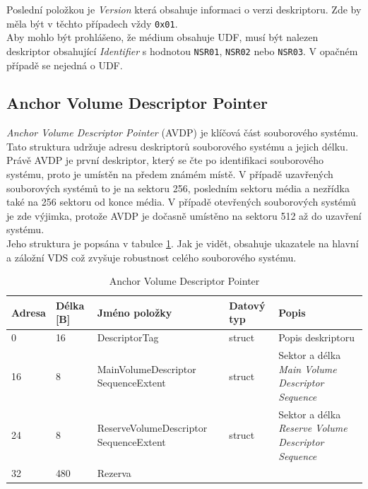 Poslední položkou je \textit{Version} která obsahuje informaci o verzi deskriptoru. Zde by měla být v těchto případech vždy \texttt{0x01}.\\
Aby mohlo být prohlášeno, že médium obsahuje UDF, musí být nalezen deskriptor obsahující \textit{Identifier} s hodnotou \texttt{NSR01}, \texttt{NSR02} nebo \texttt{NSR03}. V opačném případě se nejedná o UDF.

\subsection{Anchor Volume Descriptor Pointer}
\label{sec:avdp}
\textit{Anchor Volume Descriptor Pointer} (AVDP) je klíčová část souborového systému. Tato struktura udržuje adresu deskriptorů souborového systému a jejich délku. Právě AVDP je první deskriptor, který se čte po identifikaci souborového systému, proto je umístěn na předem známém místě.  V případě uzavřených souborových systémů to je na sektoru 256, posledním sektoru média a nezřídka také na 256 sektoru od konce média. V případě otevřených souborových systémů je zde výjimka, protože AVDP je dočasně umístěno na sektoru 512 až do uzavření systému.\\
Jeho struktura je popsána v tabulce \ref{tab-avdp}. Jak je vidět, obsahuje ukazatele na hlavní a záložní VDS což zvyšuje robustnost celého souborového systému.
\begin{table}[hb]
    \begin{tabular}{ | l | l | p{4.5cm} | p{1.3cm} | p{5.5cm} | }
        \hline
        Adresa  & Délka [B]   & Jméno položky & Datový typ    & Popis \\ \hline
        0       & 16          & DescriptorTag & struct        & Popis deskriptoru \\ \hline
        16      & 8           & MainVolumeDescriptor SequenceExtent & struct & Sektor a délka \textit{Main Volume Descriptor Sequence} \\ \hline
        24      & 8           & ReserveVolumeDescriptor SequenceExtent & struct & Sektor a délka \textit{Reserve Volume Descriptor Sequence} \\ \hline
        32      & 480         & Rezerva & & \\ \hline
    \end{tabular}
    \caption{Anchor Volume Descriptor Pointer\label{tab-avdp}}
\end{table}

